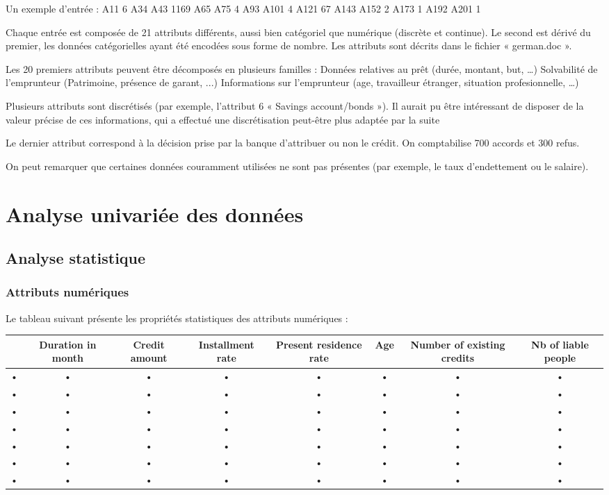 \documentclass[a4paper, 11pt]{report}
\begin{document}
Un exemple d’entrée :
A11 6 A34 A43 1169 A65 A75 4 A93 A101 4 A121 67 A143 A152 2 A173 1 A192 A201 1

Chaque entrée est composée de 21 attributs différents, aussi bien catégoriel que numérique (discrète et continue). Le second est dérivé du premier, les données catégorielles ayant été encodées sous forme de nombre. Les attributs sont décrits dans le fichier « german.doc ». 

Les 20 premiers attributs peuvent être décomposés en plusieurs familles :
Données relatives au prêt (durée, montant, but, …)
Solvabilité de l’emprunteur (Patrimoine, présence de garant, ...)
Informations sur l’emprunteur (age, travailleur étranger, situation profesionnelle, …)

Plusieurs attributs sont discrétisés (par exemple, l’attribut 6 « Savings account/bonds »). Il aurait pu être intéressant de disposer de la valeur précise de ces informations, qui a effectué une discrétisation peut-être plus adaptée par la suite

Le dernier attribut correspond à la décision prise par la banque d’attribuer ou non le crédit. On comptabilise 700 accords et 300 refus.

On peut remarquer que certaines données couramment utilisées ne sont pas présentes (par exemple, le taux d’endettement ou le salaire).

\section{Analyse univariée des données}
\subsection{Analyse statistique}
\subsubsection{Attributs numériques}
Le tableau suivant présente les propriétés statistiques des attributs numériques : 

\begin{tabular}{|c|c|c|c|c|c|c|c|}
\hline 
    & Duration in month & Credit amount & Installment rate & Present residence rate & Age & Number of existing credits & Nb of liable people \\ 
\hline 
• & • & • & • & • & • & • & • \\ 
\hline 
• & • & • & • & • & • & • & • \\ 
\hline 
• & • & • & • & • & • & • & • \\ 
\hline 
• & • & • & • & • & • & • & • \\ 
\hline 
• & • & • & • & • & • & • & • \\ 
\hline 
• & • & • & • & • & • & • & • \\ 
\hline 
• & • & • & • & • & • & • & • \\ 
\hline 
\end{tabular}
\end{document}
